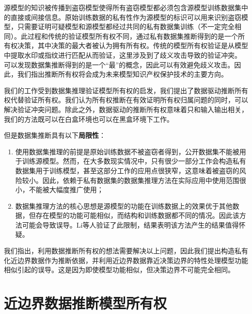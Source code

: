 源模型的知识被传播到盗窃模型使得所有盗窃模型都必须包含源模型训练数据集中的直接或间接信息。原始训练数据的私有性作为源模型的标识可以用来识别盗窃模型，只需要证明可疑模型和源模型都经过共同的私有数据集训练（不一定完全相同）。此过程和传统的验证模型所有权不同，通过私有数据集推断得到的是一个所有权决策，其中决策的最大者被认为拥有所有权。传统的模型所有权验证是从模型中提取水印或指纹进行匹配从而验证，这里涉及到了歧义攻击导致的验证冲突。 可以发现数据集推断得到的是一个“最”的概念，因此可以有效避免歧义攻击。因此，我们指出推断所有权将会成为未来模型知识产权保护技术的主要方向。

我们的工作受到数据集推理验证模型所有权的启发，我们提出了数据驱动推断所有权代替验证所有权。我们认为所有权推断在有效证明所有权归属问题的同时，可以解决验证冲突问题。除此之外，数据驱动的推断所有权意味着只和输入输出相关，我们的方法既可以在白盒环境也可以在黑盒环境下工作。

但是数据集推断具有以下\textbf{局限性}：
\begin{enumerate}
	\renewcommand{\labelenumi}{\theenumi)}
	\item 使用数据集推理的前提是原始训练数据不被盗窃者得到，公开数据集不能被用于训练源模型。然而，在大多数现实情况中，只有很少一部分工作会构造私有数据集用于训练模型，甚至这部分工作的应用点很狭窄，这意味着被盗窃的风险较小。因此，依赖于私有数据集的数据集推理方法在实际应用中使用范围很小，不能被大幅度推广使用；
	\item 数据集推理方法的核心思想是源模型的功能在训练数据上的效果优于其他数据，但存在模型的功能可能相似，而结构和训练数据都不同的情况。因此该方法可能会导致误导。Li等人\cite{lao2022deepauth}验证了此限制，结果表明该方法产生的结果值得怀疑。
\end{enumerate}

我们指出，利用数据推断所有权的想法需要解决以上问题，因此我们提出构造私有化近边界数据作为推断依据，并利用近边界数据靠近决策边界的特性处理模型功能相似引起的误导。这是因为即使模型功能相似，但决策边界不可能完全相同。

\section{近边界数据推断模型所有权}\label{4.2}

